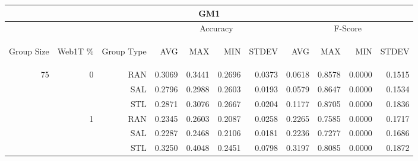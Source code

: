 \begin{center}
\begin{table}[htbp]
\begin{tabular}{ | r | r | r | r | r | r | r | r | r | r | r |}
\hline
\multicolumn{11}{|c|}{GM1}\\
\hline
 & & & \multicolumn{4}{|c|}{Accuracy} & \multicolumn{4}{|c|}{F-Score}\\ \cline{4-11}
\begin{sideways}Group Size\end{sideways} & \begin{sideways}Web1T \%\end{sideways} & \begin{sideways}Group Type\end{sideways} & \begin{sideways}AVG\end{sideways} & \begin{sideways}MAX\end{sideways} & \begin{sideways}MIN\end{sideways} & \begin{sideways}STDEV\end{sideways} & \begin{sideways}AVG\end{sideways} & \begin{sideways}MAX\end{sideways} & \begin{sideways}MIN\end{sideways} & \begin{sideways}STDEV\end{sideways}\\
\hline
\multirow{18}{*}{75}
 & \multirow{3}{*}{0} & RAN & 0.3069 & 0.3441 & 0.2696 & 0.0373 & 0.0618 & 0.8578 & 0.0000 & 0.1515\\ \cline{3-11}
 &   & SAL & 0.2796 & 0.2988 & 0.2603 & 0.0193 & 0.0579 & 0.8647 & 0.0000 & 0.1534\\ \cline{3-11}
 &   & STL & 0.2871 & 0.3076 & 0.2667 & 0.0204 & 0.1177 & 0.8705 & 0.0000 & 0.1836\\ \cline{2-11}
 & \multirow{3}{*}{1} & RAN & 0.2345 & 0.2603 & 0.2087 & 0.0258 & 0.2265 & 0.7585 & 0.0000 & 0.1717\\ \cline{3-11}
 &   & SAL & 0.2287 & 0.2468 & 0.2106 & 0.0181 & 0.2236 & 0.7277 & 0.0000 & 0.1686\\ \cline{3-11}
 &   & STL & 0.3250 & 0.4048 & 0.2451 & 0.0798 & 0.3197 & 0.8085 & 0.0000 & 0.1872\\ \cline{2-11}

\end{tabular}
\end{table}
\end{center}
